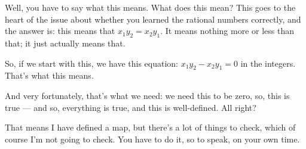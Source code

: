 \begin{speech}[00:27:52 - 00:28:57]
Well, you have to say what this means. What does this mean? This goes to the heart of the issue about whether you learned the rational numbers correctly, and the answer is: this means  that $x_1 y_2 = x_2 y_1$. It means nothing more or less than that; it just actually means that.

So, if we start with this, we have this equation:  $x_1 y_2 - x_2 y_1 = 0$ in the integers. That's what this means.

And very fortunately, that's what we need: we need this to be zero, so, this is true  --- and so, everything is true, and this is well-defined. All right?

That means I have defined a map, but there's a lot of things to check, which of course I'm not going to check. You have to do it, so to speak, on your own time.
\end{speech}

